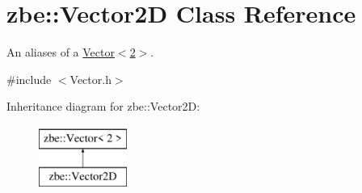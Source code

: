 \hypertarget{classzbe_1_1_vector2_d}{}\section{zbe\+:\+:Vector2\+D Class Reference}
\label{classzbe_1_1_vector2_d}


An aliases of a \hyperlink{classzbe_1_1_vector}{Vector$<$2$>$}.  




{\ttfamily \#include $<$Vector.\+h$>$}

Inheritance diagram for zbe\+:\+:Vector2\+D\+:\begin{figure}[H]
\begin{center}
\leavevmode
\includegraphics[height=2.000000cm]{classzbe_1_1_vector2_d}
\end{center}
\end{figure}
